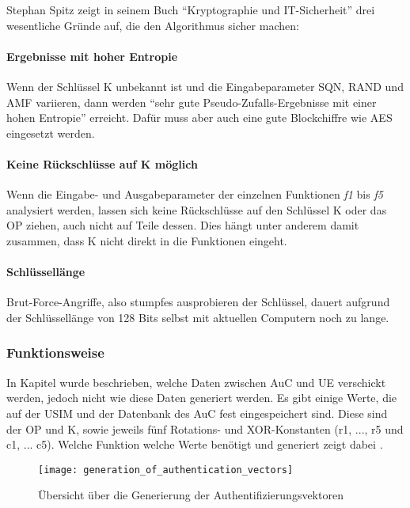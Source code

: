  Stephan Spitz zeigt in seinem Buch ``Kryptographie und IT-Sicherheit'' \cite{spitz11} drei
 wesentliche Gründe auf, die den Algorithmus sicher machen:
 
 \paragraph{Ergebnisse mit hoher Entropie}
 Wenn der Schlüssel \ac{K} unbekannt ist und die Eingabeparameter \ac{SQN}, \ac{RAND}
 und \ac{AMF} variieren, dann werden ``sehr gute Pseudo-Zufalls-Ergebnisse mit einer hohen
 Entropie'' \cite{spitz11} erreicht. Dafür muss aber auch eine gute Blockchiffre wie AES
 eingesetzt werden.
 
 \paragraph{Keine Rückschlüsse auf K möglich}
 Wenn die Eingabe- und Ausgabeparameter der einzelnen Funktionen \emph{f1} bis \emph{f5}
 analysiert werden, lassen sich keine Rückschlüsse auf den Schlüssel K oder das \acf{OP}
 ziehen, auch nicht auf Teile dessen. Dies hängt unter anderem damit zusammen, dass K nicht
 direkt in die Funktionen eingeht.
 
 \paragraph{Schlüssellänge}
 Brut-Force-Angriffe, also stumpfes ausprobieren der Schlüssel, dauert aufgrund der
 Schlüssellänge von 128 Bits selbst mit aktuellen Computern noch zu lange.
 

 \subsubsection{Funktionsweise}
 \label{milenage-funktion}
 In Kapitel  wurde beschrieben, welche Daten zwischen
 \ac{AuC} und \ac{UE} verschickt werden, jedoch nicht wie diese Daten generiert werden. Es
 gibt einige Werte, die auf der \ac{USIM} und der Datenbank des \ac{AuC} fest eingespeichert
 sind. Diese sind der \ac{OP} und \ac{K}, sowie jeweils fünf Rotations- und XOR-Konstanten
 (r1, ..., r5 und c1, ... c5). Welche Funktion welche Werte benötigt und generiert zeigt dabei .
 
 \begin{figure}[htp]
  \begin{center}
   \texttt{[image: generation\_of\_authentication\_vectors]}
  \end{center}
  \caption[Übersicht über die Generierung der Authentifizierungsvektoren]{Übersicht über die Generierung der Authentifizierungsvektoren \cite{3gpp.33.102}}
  \label{fig:funktionsubersicht}
 \end{figure}
 
